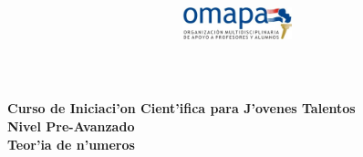 \documentclass{article}
\title{
\begin{center}
\includegraphics[width=120px, height=40px]{omapa.jpg}\\
\end{center}
}
\date{}
\begin{document}
\maketitle
\begin{center}
\bfseries{Curso de Iniciaci'on Cient'ifica para J'ovenes Talentos\\
Nivel Pre-Avanzado \\
Teor'ia de n'umeros}
\end{center}






\end{document}
